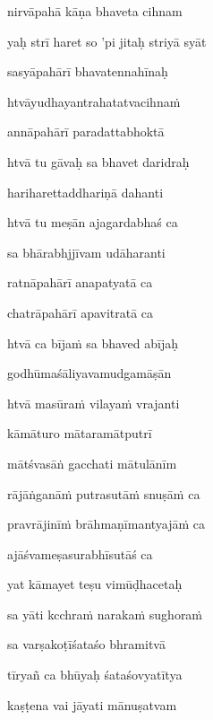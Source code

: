 \ujvers\nemsloka 
nirvāpahā kāṇa bhaveta cihnam
\dontdisplaylinenum

\nemslokab 
yaḥ strī haret so 'pi jitaḥ striyā syāt \danda\dontdisplaylinenum

\nemslokac 
sasyāpahārī bhavatennahīnaḥ
\dontdisplaylinenum

\nemslokad 
htvāyudhayantrahatatvacihnaṁ \veg\dontdisplaylinenum

\ujvers\nemsloka 
annāpahārī paradattabhoktā
\dontdisplaylinenum

\nemslokab 
htvā tu gāvaḥ sa bhavet daridraḥ \danda\dontdisplaylinenum

\nemslokac 
hariharettaddhariṇā dahanti
\dontdisplaylinenum

\nemslokad 
htvā tu meṣān ajagardabhaś ca \veg\dontdisplaylinenum

\ujvers\nemsloka 
sa bhārabhjjīvam udāharanti
\dontdisplaylinenum

\nemslokab 
ratnāpahārī anapatyatā ca \danda\dontdisplaylinenum

\nemslokac 
chatrāpahārī apavitratā ca
\dontdisplaylinenum

\nemslokad 
htvā ca bījaṁ sa bhaved abījaḥ \veg\dontdisplaylinenum

\ujvers\nemsloka 
godhūmaśāliyavamudgamāṣān
\dontdisplaylinenum

\nemslokab 
htvā masūraṁ vilayaṁ vrajanti \danda\dontdisplaylinenum

\nemslokac 
kāmāturo mātaramātputrī
\dontdisplaylinenum

\nemslokad 
mātśvasāṅ gacchati mātulānīm \veg\dontdisplaylinenum

\ujvers\nemsloka 
rājāṅganāṁ putrasutāṁ snuṣāṁ ca
\dontdisplaylinenum

\nemslokab 
pravrājinīṁ brāhmaṇīmantyajāṁ ca \danda\dontdisplaylinenum 

\nemslokac 
ajāśvameṣasurabhīsutāś ca
\dontdisplaylinenum

\nemslokad 
yat kāmayet teṣu vimūḍhacetaḥ \veg\dontdisplaylinenum

\ujvers\nemsloka 
sa yāti kcchraṁ narakaṁ sughoraṁ
\dontdisplaylinenum

\nemslokab 
sa varṣakoṭīśataśo bhramitvā \danda\dontdisplaylinenum

\nemslokac 
tīryañ ca bhūyaḥ śataśovyatītya
\dontdisplaylinenum

\nemslokad 
kaṣṭena vai jāyati mānuṣatvam \veg\dontdisplaylinenum

